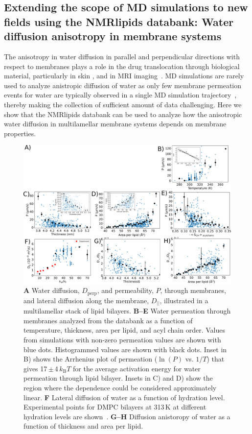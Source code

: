 \documentclass[fleqn,10pt]{wlscirep}
\begin{document}
\subsection{Extending the scope of MD simulations to new fields using the NMRlipids databank: Water diffusion anisotropy in membrane systems}
The anisotropy in water diffusion in parallel and perpendicular directions with respect to membranes plays a role in the drug translocation through biological material, particularly in skin \cite{hansen13,wen18,nitsche19,roberts21}, and in MRI imaging~\cite{topgaard20}. MD simulations are rarely used to analyze anistropic diffusion of water as only few membrane permeation events for water are typically observed in a single MD simulation trajectory~\cite{venable19,camilo2022}, thereby making the collection of sufficient amount of data challenging. Here we show that the NMRlipids databank can be used to analyze how the anisotropic water diffusion in multilamellar membrane systems depends on membrane properties. 

\begin{figure}[tb]
    \centering
    \includegraphics[width=\linewidth]{Figures/permeation2.pdf}
    \caption{\textbf{A} Water diffusion, $D_\mathrm{perp}$, and permeability, $P$, through membranes, and lateral diffusion along the membrane, $D_{||}$, illustrated in a multilamellar stack of lipid bilayers. 
    \textbf{B--E} Water permeation through membranes analyzed from the databank as a function of temperature, thickness, area per lipid, and acyl chain order. Values from simulations with non-zero permeation values are shown with blue dots. Histogrammed values are shown with black dots. Inset in B) shows the Arrhenius plot of permeation ($\ln(P)$ vs. $1/T$) that gives 17\,$\pm$\,4\,$k_\mathrm{B}T$ for the average activation energy for water permeation through lipid bilayer. Insets in C) and D) show the region where the dependence could be considered approximately linear.
    \textbf{F} Lateral diffusion of water as a function of hydration level. Experimental points for DMPC bilayers at 313\,K at different hydration levels are shown~\cite{rudakova04}.
    \textbf{G--H} Diffusion anistoropy of water as a function of thickness and area per lipid. }
    \label{fig:permeability}
\end{figure}
\end{document}
